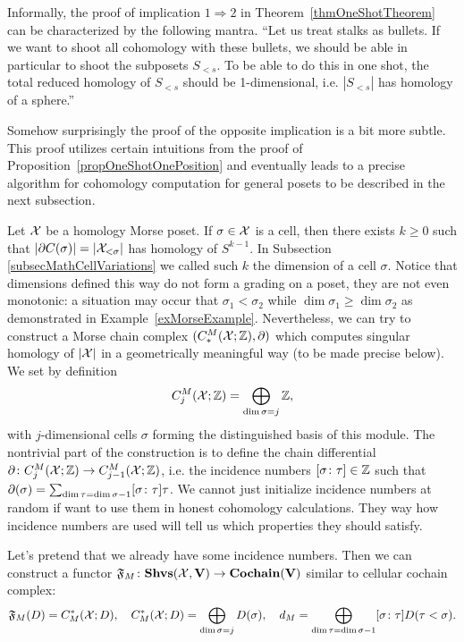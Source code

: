 \begin{rem}\label{remOneCohomologyOneBullet}
Informally, the proof of implication $1\Rightarrow 2$ in Theorem~\ref{thmOneShotTheorem} can be characterized by the following mantra. ``Let us treat stalks as bullets. If we want to shoot all cohomology with these bullets, we should be able in particular to shoot the subposets $S_{<s}$. To be able to do this in one shot, the total reduced homology of $S_{<s}$ should be 1-dimensional, i.e. $|S_{<s}|$ has homology of a sphere.''
\end{rem}

Somehow surprisingly the proof of the opposite implication is a bit more subtle. This proof utilizes certain intuitions from the proof of Proposition~\ref{propOneShotOnePosition} and eventually leads to a precise algorithm for cohomology computation for general posets to be described in the next subsection.

\begin{con}\label{conIncidenceRequirements}
Let $\mathcal{X}$ be a homology Morse poset. If $\sigma\in\mathcal{X}$ is a cell, then there exists $k\geq 0$ such that $|\partial C(\sigma)|=|\mathcal{X}_{<\sigma}|$ has homology of $S^{k-1}$. In Subsection \ref{subsecMathCellVariations} we called such $k$ the dimension of a cell $\sigma$. Notice that dimensions defined this way do not form a grading on a poset, they are not even monotonic: a situation may occur that $\sigma_1<\sigma_2$ while $\dim\sigma_1\geq \dim\sigma_2$ as demonstrated in Example~\ref{exMorseExample}. Nevertheless, we can try to construct a Morse chain complex $(C_*^{M}(\mathcal{X};\mathbb{Z}),\partial)$ which computes singular homology of $|\mathcal{X}|$ in a geometrically meaningful way (to be made precise below). We set by definition
\[
C_j^{M}(\mathcal{X};\mathbb{Z})=\bigoplus_{\dim\sigma=j}\mathbb{Z},
\]
with $j$-dimensional cells $\sigma$ forming the distinguished basis of this module. The nontrivial part of the construction is to define the chain differential $\partial\colon C_j^{M}(\mathcal{X};\mathbb{Z})\to C_{j-1}^{M}(\mathcal{X};\mathbb{Z})$, i.e. the incidence numbers $[\sigma\colon \tau]\in\mathbb{Z}$ such that $\partial(\sigma)=\sum_{\dim\tau=\dim\sigma-1}[\sigma\colon \tau]\tau$. We cannot just initialize incidence numbers at random if want to use them in honest cohomology calculations. They way how incidence numbers are used will tell us which properties they should satisfy.

Let's pretend that we already have some incidence numbers. Then we can construct a functor $\mathfrak{F}_M\colon\mathbf{Shvs}(\mathcal{X},\mathbf{V})\to\mathbf{Cochain}(\mathbf{V})$ similar to cellular cochain complex:
\begin{equation}\label{eqMorseCochain}
\mathfrak{F}_M(D)=C^*_M(\mathcal{X};D),\quad C^*_M(\mathcal{X};D)=\bigoplus_{\dim\sigma=j}D(\sigma),\quad d_M=\bigoplus_{\dim\tau=\dim\sigma-1}[\sigma\colon \tau] D(\tau<\sigma).
\end{equation}
\end{con}

